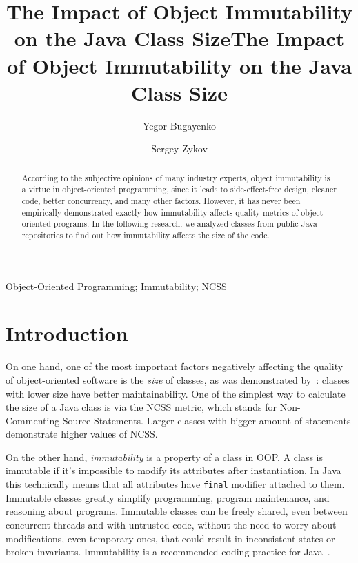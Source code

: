\documentclass[3p,times,procedia]{elsarticle}
\title{The Impact of Object Immutability on the Java Class Size}
\begin{document}
\begin{frontmatter}

%
\title{The Impact of Object Immutability on the Java Class Size}
\author[a]{Yegor Bugayenko}
\author[b]{Sergey Zykov}
\address[a]{Huawei Technologies Co., Ltd., Moscow, Russia}
\address[b]{Higher School of Economics, Moscow, Russia}
\begin{abstract}
According to the subjective opinions of many industry experts,
object immutability is a virtue in object-oriented programming, since it
leads to side-effect-free design, cleaner code, better concurrency,
and many other factors. However, it has never been empirically
demonstrated exactly how immutability affects quality metrics of
object-oriented programs. In the following research, we analyzed
\thetotaljavafiles{} classes from \thetotalrepos{} public Java repositories
to find out how immutability affects the size of the code.
\end{abstract}
\begin{keyword}Object-Oriented Programming; Immutability; NCSS\end{keyword}
\end{frontmatter}

\section{Introduction}

On one hand, one of the most important factors negatively affecting the quality
of object-oriented software is the \emph{size} of classes, as was
demonstrated by~\citet{li1993,al2013}: classes with lower size have better maintainability.
One of the simplest way
to calculate the size of a Java class is via the NCSS metric, which
stands for Non-Commenting Source Statements. Larger classes with bigger
amount of statements demonstrate higher values of NCSS.

On the other hand, \emph{immutability} is a property of a class in OOP. A class is immutable if
it's impossible to modify its attributes after instantiation. In Java this
technically means that all attributes have \texttt{final} modifier attached
to them.
Immutable classes greatly simplify programming, program maintenance, and
reasoning about programs. Immutable classes can be freely shared, even between
concurrent threads and with untrusted code, without the need to worry
about modifications, even temporary ones, that could result in
inconsistent states or broken invariants.
Immutability is a recommended coding practice for Java~\citep{bloch2016}.
\end{document}
